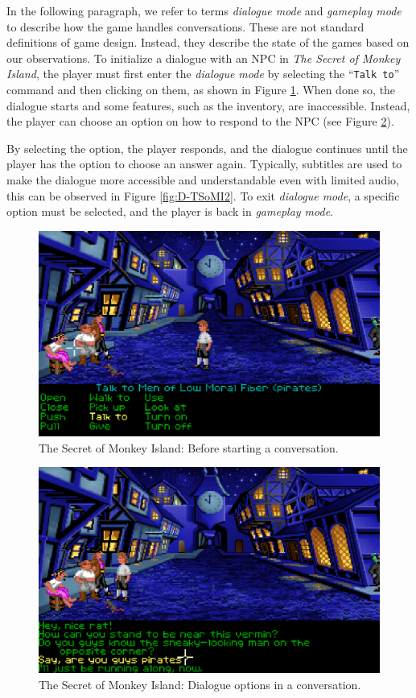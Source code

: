 In the following paragraph, we refer to terms \textit{dialogue mode} and \textit{gameplay mode} to describe how the game handles conversations. These are not standard definitions of game design. Instead, they describe the state of the games based on our observations. To initialize a dialogue with an NPC in \textit{The Secret of Monkey Island}, the player must first enter the \textit{dialogue mode} by selecting the “\texttt{Talk to}” command and then clicking on them, as shown in Figure \ref{fig:D-TSoMI0}. When done so, the dialogue starts and some features, such as the inventory, are inaccessible. Instead, the player can choose an option on how to respond to the NPC (see Figure \ref{fig:D-TSoMI1}). 

By selecting the option, the player responds, and the dialogue continues until the player has the option to choose an answer again. Typically, subtitles are used to make the dialogue more accessible and understandable even with limited audio, this can be observed in Figure \ref{fig:D-TSoMI2}. To exit \textit{dialogue mode}, a specific option must be selected, and the player is back in \textit{gameplay mode}.
\begin{figure}[H]
\centering
\includegraphics[width=.85\linewidth]{img/D-TSoMI0.png}
\caption{The Secret of Monkey Island: Before starting a conversation.}
\label{fig:D-TSoMI0}
\end{figure}

\begin{figure}[H]
\centering
\includegraphics[width=.85\linewidth]{img/D-TSoMI1.png}
\caption{The Secret of Monkey Island: Dialogue options in a conversation.}
\label{fig:D-TSoMI1}
\end{figure}

